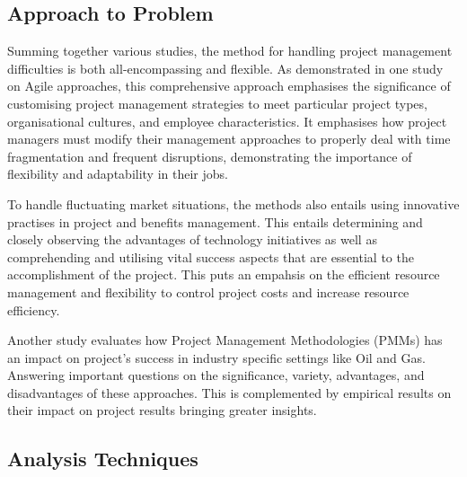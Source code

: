 \documentclass{article}
\begin{document}
\subsection{Approach to Problem}
Summing together various studies, the method for handling project management difficulties is both all-encompassing and flexible. As demonstrated in one study on Agile approaches, this comprehensive approach emphasises the significance of customising project management strategies to meet particular project types, organisational cultures, and employee characteristics. It emphasises how project managers must modify their management approaches to properly deal with time fragmentation and frequent disruptions, demonstrating the importance of flexibility and adaptability in their jobs.

To handle fluctuating market situations, the methods also entails using innovative practises in project and benefits management. This entails determining and closely observing the advantages of technology initiatives as well as comprehending and utilising vital success aspects that are essential to the accomplishment of the project. This puts an empahsis on the efficient resource management and flexibility to control project costs and increase resource efficiency.

Another study evaluates how Project Management Methodologies (PMMs)
has an impact on project's success in industry specific settings like Oil and Gas. Answering important questions on the significance, variety, advantages, and disadvantages of these approaches. This is complemented by empirical results on their impact on project results bringing greater insights.


\subsection{Analysis Techniques}
\end{document}
